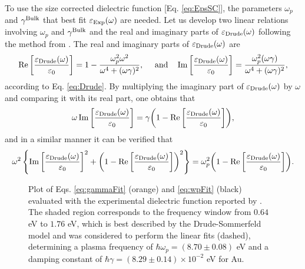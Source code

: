 To use the size corrected dielectric function [Eq. \eqref{eq:EpsSC}], the parameters  $\omega_p$ and $\gamma^\text{\scriptsize Bulk}$ that best fit  $\varepsilon_\text{\scriptsize Exp}(\omega)$ are needed. Let us develop two linear relations involving $\omega_p$ and $\gamma^\text{\scriptsize Bulk}$ and the real and imaginary parts of $\varepsilon_\text{\scriptsize Drude}(\omega)$ following the method from \citeauthor{mendoza_herrera_determination_2014}. The real and imaginary parts of $\varepsilon_\text{\scriptsize Drude}(\omega)$ are
%
\begin{align}
\Re\qty[\frac{\varepsilon_\text{\scriptsize Drude}(\omega)}{\varepsilon_0}] = 1 - \frac{\omega_p^2 \omega^2}{\omega^4 + (\omega\gamma)^2},
\qqtext{ and}
\Im\qty[\frac{\varepsilon_\text{\scriptsize Drude}(\omega)}{\varepsilon_0}]  = \frac{\omega_p^2  (\omega\gamma)}{\omega^4 + (\omega\gamma)^2},
\end{align}
%
according to Eq. \eqref{eq:Drude}. By multiplying the imaginary part of $\varepsilon_\text{\scriptsize Drude}(\omega)$ by $\omega$ and comparing it with its real part, one obtains that
%
\begin{align}
\omega \Im\qty[\frac{\varepsilon_\text{\scriptsize Drude}(\omega)}{\varepsilon_0}] =
 \gamma \qty(1 - \Re\qty[\frac{\varepsilon_\text{\scriptsize Drude}(\omega)}{\varepsilon_0}]),
\label{eq:gammaFit}
\end{align}
%
and in a similar manner it can be verified that
\begin{align}
\omega^2\left\{ \Im\qty[\frac{\varepsilon_\text{\scriptsize Drude}(\omega)}{\varepsilon_0}]^2
			+ \qty(1-\Re\qty[\frac{\varepsilon_\text{\scriptsize Drude}(\omega)}{\varepsilon_0}])^2 \right\}
 = \omega_p^2 \qty(1 - \Re\qty[\frac{\varepsilon_\text{\scriptsize Drude}(\omega)}{\varepsilon_0}]).
 \label{eq:wpFit}
\end{align}
\begin{figure}[h!]
\def\svgwidth{.85\textwidth} \small\centering
{}
\caption[Plasma frequency and damping constant determination for Au]{Plot of Eqs. \eqref{eq:gammaFit} (orange) and \eqref{eq:wpFit} (black) evaluated with the experimental dielectric function reported by \citeauthor{johnson_optical_1972} \cite{johnson_optical_1972}. The shaded region corresponds to the frequency window from $0.64$ eV to $1.76$ eV, which is best described by the Drude-Sommerfeld model and  was considered to perform the linear fits (dashed), determining a plasma frequency of $\hbar\omega_p =(8.70\pm0.08)$ eV and a damping constant of $\hbar\gamma = (8.29 \pm 0.14)\times 10^{-2}$ eV for Au. }
\label{fig:DrudeFit}
\end{figure}

